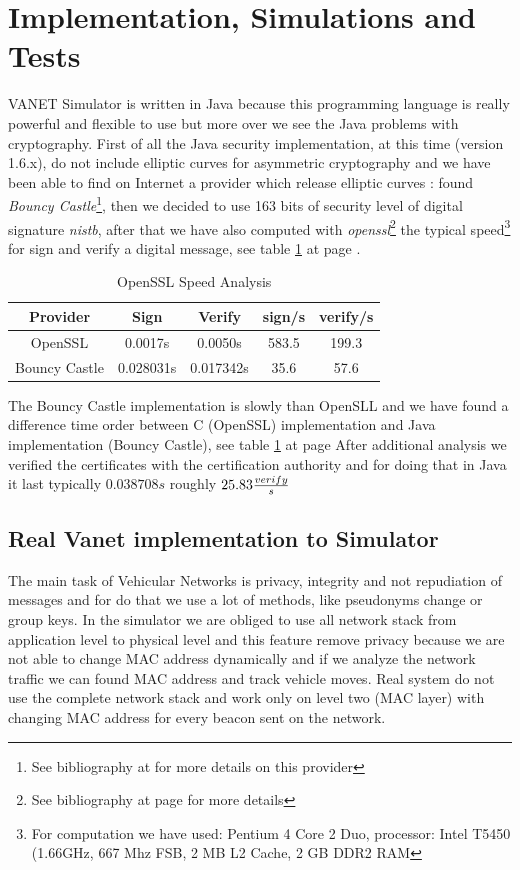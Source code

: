 \section{Implementation, Simulations and Tests}
VANET Simulator is written in Java because this programming language is really powerful and flexible to use but more over we see the Java problems with cryptography. First of all the Java security implementation, at this time (version 1.6.x), do not include elliptic curves for asymmetric cryptography and we have been able to find  on Internet a provider which release elliptic curves : found \textit{Bouncy Castle}\footnote{See bibliography at \pageref{bibliography} for more details on this provider}, then we decided to  use 163 bits  of security level of digital signature \textit{nistb}, after that we have also computed with \emph{openssl}\footnote{See bibliography at page \pageref{bibliography} for more details} the typical speed\footnote{For computation we have used: Pentium 4 Core 2 Duo, processor: Intel T5450 (1.66GHz, 667 Mhz FSB, 2 MB L2 Cache, 2 GB DDR2 RAM} for sign and verify a digital message, see table \ref{tab:OpensslVelocity} at page \pageref{tab:OpensslVelocity}.
\begin{table}[!ht]
	\centering
	\caption{OpenSSL Speed Analysis}
	\begin{tabular}{|c|c|c|c|c|}
	\hline\hline 
	\textbf{Provider} & \textbf{Sign} & \textbf{Verify} & \textbf{sign/s} & \textbf{verify/s} \\
	\hline
	OpenSSL & 0.0017s & 0.0050s & 583.5 & 199.3 \\
	\hline
	Bouncy Castle & 0.028031s & 0.017342s & 35.6 & 57.6 \\
	\hline
	\hline     %
 	\end{tabular} 
	\label{tab:OpensslVelocity}
\end{table}
The Bouncy Castle implementation is slowly than OpenSLL and we have found a difference time order  between C (OpenSSL)  implementation and Java implementation (Bouncy Castle), see table \ref{tab:OpensslVelocity} at page 
After additional analysis we verified the certificates with the certification authority and for doing that in Java it last typically $0.038708s$ roughly $25.83 {verify \over s}$
\subsection{Real Vanet implementation to Simulator}
The main task of Vehicular Networks is privacy, integrity and not repudiation of messages and for do that we use a lot of methods, like pseudonyms change or group keys. In the simulator we are obliged to use all network stack from application level to physical level and this feature remove privacy because we are not able to change MAC address dynamically and if we analyze the network traffic we can found MAC address and track vehicle moves. Real system do not use the complete network stack and work only on level two (MAC layer) with changing MAC address for every beacon sent on the network.

